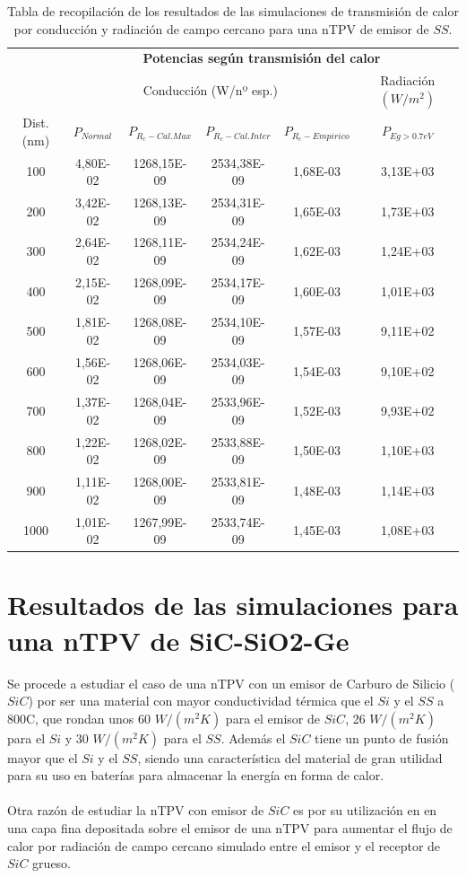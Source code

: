\begin{table}[H]
	\centering
	\caption{Tabla de recopilación de los resultados de las simulaciones de transmisión de calor por conducción y radiación de campo cercano para una nTPV de emisor de $SS$.}
		\begin{tabular}{|c||c|c|c|c||c|}
		\hline
		\multirow{2}{*}{ }& \multicolumn{5}{c|}{\textbf{\large Potencias según transmisión del calor}}\\ \cline{2-6}
& \multicolumn{4}{c||}{Conducción (W/nº esp.)}& Radiación $(W/m^2)$\\ \hline
Dist. (nm)&$P_{Normal}$&$P_{R_c-Cal.Max}$&$P_{R_c-Cal.Inter}$&$P_{R_c-Empirico}$&$P_{Eg>0.7eV}$\\ \hline \hline
100&4,80E-02&1268,15E-09&2534,38E-09&1,68E-03&3,13E+03\\ \hline 
200&3,42E-02&1268,13E-09&2534,31E-09&1,65E-03&1,73E+03\\ \hline 
300&2,64E-02&1268,11E-09&2534,24E-09&1,62E-03&1,24E+03\\ \hline 
400&2,15E-02&1268,09E-09&2534,17E-09&1,60E-03&1,01E+03\\ \hline 
500&1,81E-02&1268,08E-09&2534,10E-09&1,57E-03&9,11E+02\\ \hline 
600&1,56E-02&1268,06E-09&2534,03E-09&1,54E-03&9,10E+02\\ \hline 
700&1,37E-02&1268,04E-09&2533,96E-09&1,52E-03&9,93E+02\\ \hline 
800&1,22E-02&1268,02E-09&2533,88E-09&1,50E-03&1,10E+03\\ \hline 
900&1,11E-02&1268,00E-09&2533,81E-09&1,48E-03&1,14E+03\\ \hline 
1000&1,01E-02&1267,99E-09&2533,74E-09&1,45E-03&1,08E+03\\ \hline 
		\end{tabular}
	\label{tab:SsSiO2Ge}
\end{table}
\vfill \newpage
\section{Resultados de las simulaciones para una nTPV de SiC-SiO2-Ge}\label{sec:res_SiCSiO2Ge}
Se procede a estudiar el caso de una nTPV con un emisor de Carburo de Silicio ($SiC$) por ser una material con mayor conductividad térmica que el $Si$ y el $SS$ a 800\textdegree C, que rondan unos 60 $W/(m^2 K)$ para el emisor de $SiC$, 26 $W/(m^2 K)$ para el $Si$ y 30 $W/(m^2 K)$ para el $SS$. Además el $SiC$ tiene un punto de fusión mayor que el $Si$ y el $SS$, siendo una característica del material de gran utilidad para su uso en baterías para almacenar la energía en forma de calor.\\\\
Otra razón de estudiar la nTPV con emisor de $SiC$ es por su utilización en \cite{doi:Near_field_ThinFilm} en una capa fina depositada sobre el emisor de una nTPV para aumentar el flujo de calor por radiación de campo cercano simulado entre el emisor y el receptor de $SiC$ grueso.
